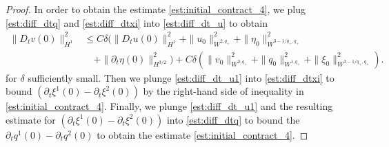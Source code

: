 \documentclass[letterpaper,reqno,10pt,twoside]{amsart}
\theoremstyle{definition}
\theoremstyle{remark}
\def\p{\partial}
\begin{document}
\begin{appendix}
\begin{proof}
				In order to obtain the estimate \eqref{est:initial_contract_4}, we plug \eqref{est:diff_dtq} and \eqref{est:diff_dtxi} into \eqref{est:diff_dt_u} to obtain
				\begin{equation}\label{est:diff_dt_u1}
					\begin{aligned}
						\|D_tv(0)\|_{H^1}^2&\le C\delta(\|D_tu(0)\|_{H^1}^2+\|u_0\|_{W^{2,q_+}}^2+\|\eta_0\|_{W^{3-1/q_+,q_+}}^2\\
						&\quad+\|\p_t\eta(0)\|_{H^{3/2}}^2)+C\delta(\|v_0\|_{W^{2,q_+}}^2+\|q_0\|_{W^{1,q_+}}^2+\|\xi_0\|_{W^{3-1/q_+,q_+}}^2).
					\end{aligned}
				\end{equation}
				for $\delta$ sufficiently small. Then we plunge \eqref{est:diff_dt_u1} into \eqref{est:diff_dtxi} to bound $(\p_t\xi^1(0)-\p_t\xi^2(0))$ by the right-hand side of inequality in \eqref{est:initial_contract_4}. Finally, we plunge \eqref{est:diff_dt_u1} and the resulting estimate for $(\p_t\xi^1(0)-\p_t\xi^2(0))$ into \eqref{est:diff_dtq} to bound the $\p_tq^1(0)-\p_tq^2(0)$ to obtain the estimate  \eqref{est:initial_contract_4}.
			\end{proof}
			

\end{appendix}
\end{document}
